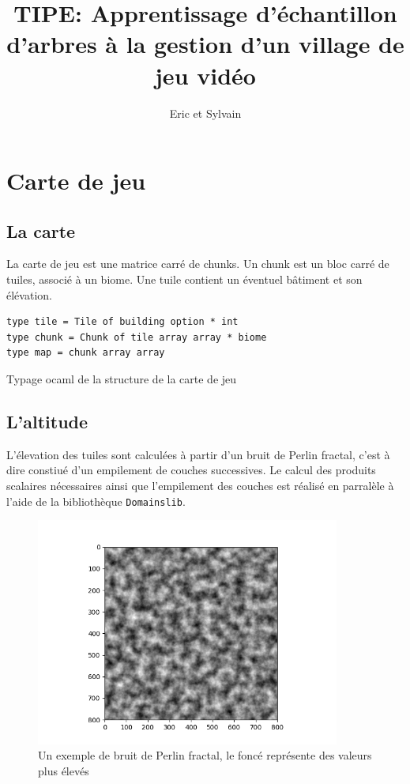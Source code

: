 \documentclass{article}
\title{TIPE: Apprentissage d'échantillon d'arbres à la gestion d'un village de jeu vidéo}
\author{Eric et Sylvain}
\date{}
\begin{document}
\maketitle
\tableofcontents
\newpage

\section{Carte de jeu}

\subsection{La carte}
La carte de jeu est une matrice carré de chunks. Un chunk est un bloc carré de tuiles, associé à un biome. Une tuile contient un éventuel bâtiment et son élévation.

\begin{listing}[!ht]
\begin{verbatim}
type tile = Tile of building option * int
type chunk = Chunk of tile array array * biome
type map = chunk array array
\end{verbatim}
\caption{Typage ocaml de la structure de la carte de jeu}
\end{listing}

\subsection{L'altitude}

L'élevation des tuiles sont calculées à partir d'un bruit de Perlin fractal, c'est à dire constiué d'un empilement de couches successives. Le calcul des produits scalaires nécessaires ainsi que l'empilement des couches est réalisé en parralèle à l'aide de la bibliothèque \texttt{Domainslib}.

\begin{figure}[h]
  \centering
  \includegraphics[width=10cm]{perlin_map.png}
  \caption{Un exemple de bruit de Perlin fractal, le foncé représente des valeurs plus élevés}
\end{figure}
\end{document}
